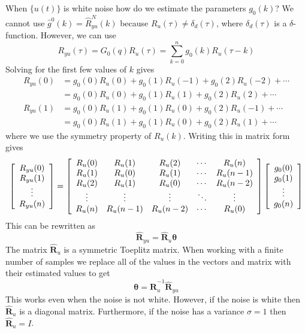 \documentclass[lecture,12pt,]{pcms-l}
\theoremstyle{example}
\begin{document}
When $\{u(t)\}$ is white noise how do we estimate the parameters $g_0(k)$? We cannot use $\hat{g}^0(k) = \hat{R}_{yu}^N(k)$ because $R_u(\tau)\neq \delta_d(\tau)$, where $\delta_d(\tau)$ is a $\delta$-function. However, we can use
$$R_{yu}(\tau) = G_0(q)R_u(\tau) = \sum_{k=0}^ng_0(k)R_u(\tau-k)$$
Solving for the first few values of $k$ gives
\begin{align*}
R_{yu}(0) &= g_0(0)R_u(0) + g_0(1)R_u(-1) + g_0(2)R_u(-2) + \cdots \\
&= g_0(0)R_u(0) + g_0(1)R_u(1) + g_0(2)R_u(2) + \cdots \\
R_{yu}(1) &= g_0(0)R_u(1) + g_0(1)R_u(0) + g_0(2)R_u(-1) + \cdots \\
&= g_0(0)R_u(1) + g_0(1)R_u(0) + g_0(2)R_u(1) + \cdots
\end{align*}
where we use the symmetry property of $R_u(k)$. Writing this in matrix form gives
\begin{align*}
\left[\begin{array}{c}
R_{yu}(0) \\ R_{yu}(1) \\ \vdots \\ R_{yu}(n)
\end{array}\right] =
\left[\begin{array}{c c c c c}
R_u(0) & R_u(1) & R_u(2) & \cdots & R_u(n) \\
R_u(1) & R_u(0) & R_u(1) & \cdots & R_u(n-1) \\
R_u(2) & R_u(1) & R_u(0) & \cdots & R_u(n-2) \\
\vdots & \vdots & \vdots & \ddots & \vdots \\
R_u(n) & R_u(n-1) & R_u(n-2) & \cdots & R_u(0)
\end{array}\right]
\left[\begin{array}{c}
g_0(0) \\ g_0(1) \\ \vdots \\ g_0(n)
\end{array}\right]
\end{align*}
This can be rewritten as
$$\hat{\mathbf{R}}_{yu} = \hat{\mathbf{R}}_u\mathbf{\theta}$$
The matrix $\hat{\mathbf{R}}_u$ is a symmetric Toeplitz matrix. When working with a finite number of samples we replace all of the values in the vectors and matrix with their estimated values to get
$$\mathbf{\theta} = \hat{\mathbf{R}}_u^{-1}\hat{\mathbf{R}}_{yu}$$
This works even when the noise is not white. However, if the noise is white then $\hat{\mathbf{R}}_u$ is a diagonal matrix. Furthermore, if the noise has a variance $\sigma=1$ then $\hat{\mathbf{R}}_u=I$.
\end{document}

